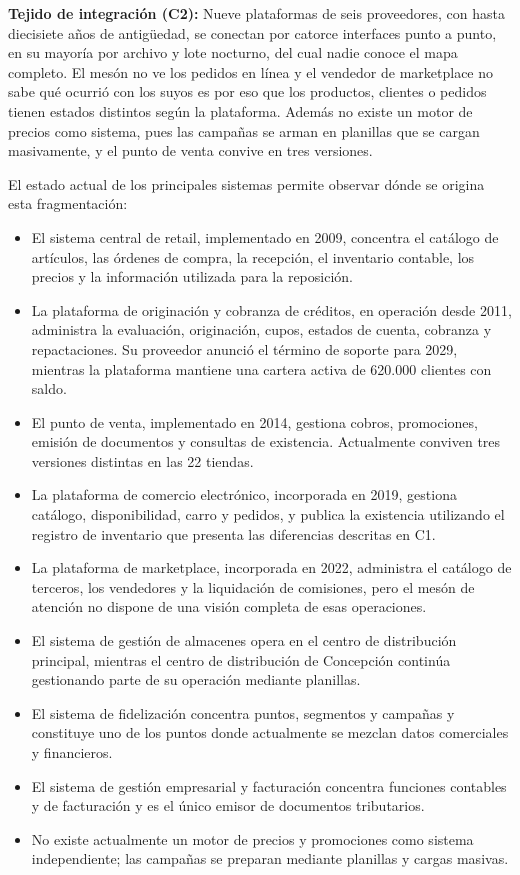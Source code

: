 \documentclass[11pt]{article}
\providecommand{\tightlist}{%
  \setlength{\itemsep}{0pt}\setlength{\parskip}{0pt}}
\begin{document}
\textbf{Tejido de integración (C2):} Nueve plataformas de seis proveedores, con hasta diecisiete años de antigüedad, se conectan por catorce interfaces punto a punto, en su mayoría por archivo y lote nocturno, del cual nadie conoce el mapa completo. El mesón no ve los pedidos en línea y el vendedor de marketplace no sabe qué ocurrió con los suyos es por eso que los productos, clientes o pedidos tienen estados distintos según la plataforma. Además no existe un motor de precios como sistema, pues las campañas se arman en planillas que se cargan masivamente, y el punto de venta convive en tres versiones.

El estado actual de los principales sistemas permite observar dónde se origina esta fragmentación:

\begin{itemize}
\tightlist
\item
  El sistema central de retail, implementado en 2009, concentra el catálogo de artículos, las órdenes de compra, la recepción, el inventario contable, los precios y la información utilizada para la reposición.
\item
  La plataforma de originación y cobranza de créditos, en operación desde 2011, administra la evaluación, originación, cupos, estados de cuenta, cobranza y repactaciones. Su proveedor anunció el término de soporte para 2029, mientras la plataforma mantiene una cartera activa de 620.000 clientes con saldo.
\item
  El punto de venta, implementado en 2014, gestiona cobros, promociones, emisión de documentos y consultas de existencia. Actualmente conviven tres versiones distintas en las 22 tiendas.
\item
  La plataforma de comercio electrónico, incorporada en 2019, gestiona catálogo, disponibilidad, carro y pedidos, y publica la existencia utilizando el registro de inventario que presenta las diferencias descritas en C1.
\item
  La plataforma de marketplace, incorporada en 2022, administra el catálogo de terceros, los vendedores y la liquidación de comisiones, pero el mesón de atención no dispone de una visión completa de esas operaciones.
\item
  El sistema de gestión de almacenes opera en el centro de distribución principal, mientras el centro de distribución de Concepción continúa gestionando parte de su operación mediante planillas.
\item
  El sistema de fidelización concentra puntos, segmentos y campañas y constituye uno de los puntos donde actualmente se mezclan datos comerciales y financieros.
\item
  El sistema de gestión empresarial y facturación concentra funciones contables y de facturación y es el único emisor de documentos tributarios.
\item
  No existe actualmente un motor de precios y promociones como sistema independiente; las campañas se preparan mediante planillas y cargas masivas.
\end{itemize}
\end{document}
